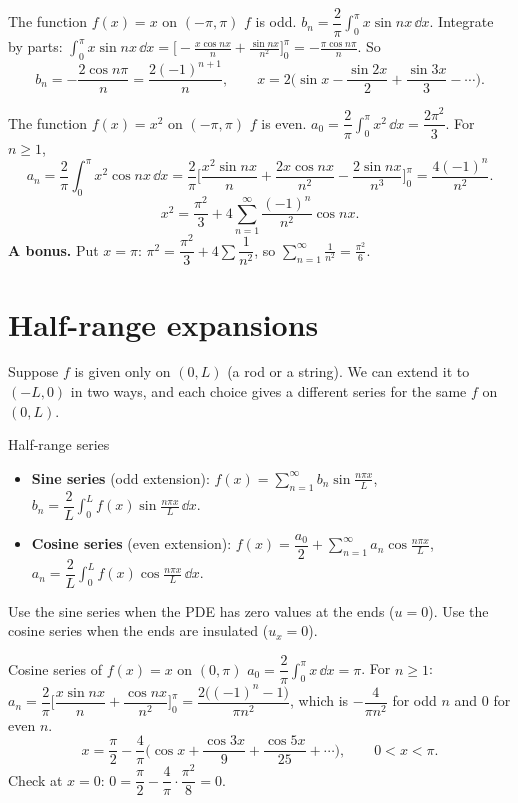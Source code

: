\begin{examplebox}{The function $f(x)=x$ on $(-\pi,\pi)$}
$f$ is odd. $b_n = \dfrac2\pi\displaystyle\int_0^\pi x\sin nx\,\dd x$. Integrate by parts:
$\displaystyle\int_0^\pi x\sin nx\,\dd x = \Big[-\frac{x\cos nx}{n} + \frac{\sin nx}{n^2}\Big]_0^\pi = -\frac{\pi\cos n\pi}{n}$. So
\[ b_n = -\frac{2\cos n\pi}{n} = \frac{2(-1)^{n+1}}{n}, \qquad x = 2\Big(\sin x - \frac{\sin 2x}{2} + \frac{\sin 3x}{3} - \cdots\Big). \]
\end{examplebox}

\begin{examplebox}{The function $f(x)=x^2$ on $(-\pi,\pi)$}
$f$ is even. $a_0 = \dfrac2\pi\displaystyle\int_0^\pi x^2\,\dd x = \dfrac{2\pi^2}{3}$. For $n\ge1$,
\[ a_n = \frac2\pi\int_0^\pi x^2\cos nx\,\dd x = \frac2\pi\Big[\frac{x^2\sin nx}{n} + \frac{2x\cos nx}{n^2} - \frac{2\sin nx}{n^3}\Big]_0^\pi = \frac{4(-1)^n}{n^2}. \]
\[ x^2 = \frac{\pi^2}{3} + 4\sum_{n=1}^{\infty}\frac{(-1)^n}{n^2}\cos nx. \]
\textbf{A bonus.} Put $x = \pi$: $\pi^2 = \dfrac{\pi^2}{3} + 4\sum\dfrac1{n^2}$, so $\displaystyle\sum_{n=1}^\infty\frac{1}{n^2} = \frac{\pi^2}{6}$.
\end{examplebox}

\section{Half-range expansions}

Suppose $f$ is given only on $(0,L)$ (a rod or a string). We can extend it to $(-L,0)$ in two ways, and each choice gives a different series for the same $f$ on $(0,L)$.

\begin{methodbox}{Half-range series}
\begin{itemize}
  \item \textbf{Sine series} (odd extension): $f(x) = \displaystyle\sum_{n=1}^\infty b_n\sin\frac{n\pi x}{L}$, \quad $b_n = \dfrac2L\displaystyle\int_0^L f(x)\sin\frac{n\pi x}{L}\,\dd x$.
  \item \textbf{Cosine series} (even extension): $f(x) = \dfrac{a_0}{2} + \displaystyle\sum_{n=1}^\infty a_n\cos\frac{n\pi x}{L}$, \quad $a_n = \dfrac2L\displaystyle\int_0^L f(x)\cos\frac{n\pi x}{L}\,\dd x$.
\end{itemize}
Use the sine series when the PDE has zero values at the ends ($u=0$). Use the cosine series when the ends are insulated ($u_x=0$).
\end{methodbox}

\begin{examplebox}{Cosine series of $f(x) = x$ on $(0,\pi)$}
$a_0 = \dfrac2\pi\displaystyle\int_0^\pi x\,\dd x = \pi$. For $n\ge1$:
$a_n = \dfrac2\pi\Big[\dfrac{x\sin nx}{n} + \dfrac{\cos nx}{n^2}\Big]_0^\pi = \dfrac{2\big((-1)^n - 1\big)}{\pi n^2}$, which is $-\dfrac{4}{\pi n^2}$ for odd $n$ and $0$ for even $n$.
\[ x = \frac\pi2 - \frac4\pi\Big(\cos x + \frac{\cos 3x}{9} + \frac{\cos 5x}{25} + \cdots\Big),\qquad 0<x<\pi. \]
Check at $x=0$: $0 = \dfrac\pi2 - \dfrac4\pi\cdot\dfrac{\pi^2}{8} = 0$. \checkmark
\end{examplebox}

